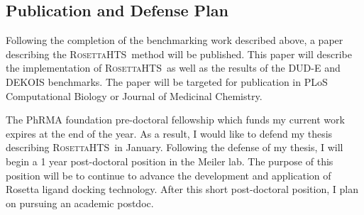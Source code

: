 \documentclass[11pt, oneside]{article}   	%
\newcommand{\rhts}{\textsc{RosettaHTS}\ }
\begin{document}
\subsection{Publication and Defense Plan}
Following the completion of the benchmarking work described above, a paper describing the \rhts method will be published.
This paper will describe the implementation of \rhts as well as the results of the DUD-E and DEKOIS benchmarks.
The paper will be targeted for publication in PLoS Computational Biology or Journal of Medicinal Chemistry.

The PhRMA foundation pre-doctoral fellowship which funds my current work expires at the end of the year.  
As a result, I would like to defend my thesis describing \rhts in January. 
Following the defense of my thesis, I will begin a 1 year post-doctoral position in the Meiler lab.
The purpose of this position will be to continue to advance the development and application of Rosetta ligand docking technology.
After this short post-doctoral position, I plan on pursuing an academic postdoc. 



\end{document}
